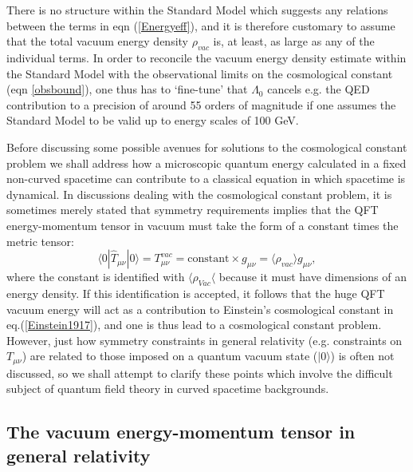 \documentclass[12pt]{article}
\def\ss{\subsection}
\begin{document}
There is no structure within the Standard Model which suggests any
relations between the terms in eqn (\ref{Energyeff}), and it is
therefore customary to assume that the total vacuum energy density
$\rho_{vac}$ is, at least, as large as any of the individual
terms. In order to reconcile the vacuum energy density estimate
within the Standard Model with the observational limits on the
cosmological constant (eqn \ref{obsbound}), one thus has to
`fine-tune' that $\Lambda _0$ cancels e.g. the QED contribution to
a precision of around 55 orders of magnitude if one assumes the
Standard Model to be valid up to energy scales of 100 GeV.

Before discussing some possible avenues for solutions to the cosmological
constant problem we shall address how a microscopic 
quantum energy calculated in a fixed non-curved spacetime can 
contribute to a classical equation in which spacetime is dynamical.
In discussions dealing with the cosmological constant problem, it
is sometimes merely stated that symmetry requirements implies that the
QFT energy-momentum tensor in vacuum must take the form of
a constant times the metric tensor:
\begin{equation} \label{tmn}
\langle 0|\hat{T}_{\mu \nu}|0 \rangle = T^{vac}_{\mu\nu} = \mbox{constant} 
\times g_{\mu \nu} = 
\langle \rho _{vac} \rangle g_{\mu \nu},
\end{equation} 
where the constant is identified with $ \langle \rho _{Vac}\langle$ because it
must have dimensions of an energy density. If this identification
is accepted, it follows that the huge QFT vacuum energy will act
as a contribution to Einstein's cosmological constant in
eq.(\ref{Einstein1917}), and one is thus lead to a cosmological
constant problem. However, just how symmetry constraints in
general relativity (e.g. constraints on $T_{\mu\nu}$) are related
to those imposed on a quantum vacuum state ($|0 \rangle $) is often not
discussed, so we shall attempt to clarify these points which
involve the difficult subject of quantum field theory in curved
spacetime backgrounds. 

\ss{The vacuum energy-momentum tensor in general relativity}
\end{document}
